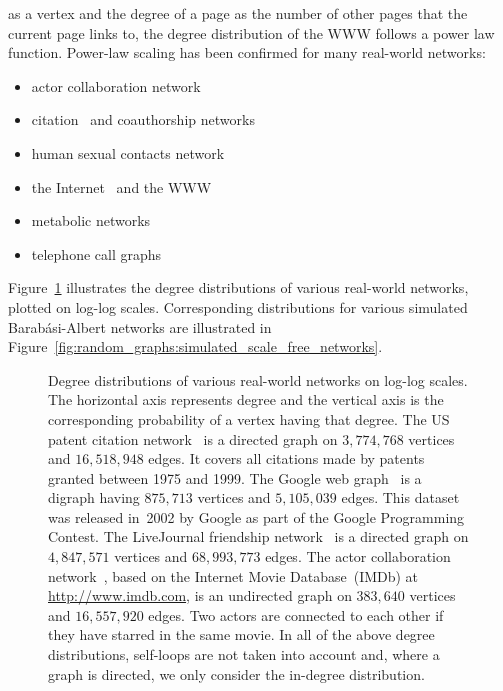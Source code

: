 as a vertex and the degree of a page as the number of other pages that
the current page links to, the degree distribution of the WWW follows
a power law function. Power-law scaling has been confirmed for many
real-world
networks:
\begin{itemize}
\item actor collaboration network~\cite{BarabasiAlbert1999}

\item citation~\cite{Price1965,Redner1998,Seglen1992} and
  coauthorship networks~\cite{Newman2001b}

\item human sexual contacts network~\cite{JonesHandcock2003,LiljerosEtAl2001}

\item the
  Internet~\cite{ChenEtAl2002,FaloutsosEtAl1999,VazquezEtAl2002} and
  the WWW~\cite{AlbertEtAl1999,BarabasiEtAl2000,BroderEtAl2000}

\item metabolic
  networks~\cite{JeongEtAl2001,JeongEtAl2000}

\item telephone call graphs~\cite{AielloEtAl2000,AielloEtAl2002}
\end{itemize}
Figure~\ref{fig:random_graphs:real_world_scale_free_networks}
illustrates the degree distributions of various real-world networks,
plotted on log-log scales. Corresponding distributions for various
simulated Barab\'asi-Albert networks are illustrated in
Figure~\ref{fig:random_graphs:simulated_scale_free_networks}.

\begin{figure}[!htbp]
\centering
{}

\caption{Degree distributions of various real-world networks on
  log-log scales. The horizontal axis represents degree and the
  vertical axis is the corresponding probability of a vertex having
  that degree. The US patent citation network~\cite{LeskovecEtAl2005}
  is a directed graph on $3,774,768$ vertices and $16,518,948$
  edges. It covers all citations made by patents granted between 1975
  and 1999. The Google web graph~\cite{LeskovecEtAl2008} is a digraph
  having $875,713$ vertices and $5,105,039$ edges. This dataset was
  released in~2002 by Google as part of the Google Programming
  Contest. The LiveJournal friendship
  network~\cite{BackstromEtAl2006,LeskovecEtAl2008} is a directed
  graph on $4,847,571$ vertices and $68,993,773$ edges. The actor
  collaboration network~\cite{BarabasiAlbert1999}, based on the
  Internet Movie Database~(IMDb) at \url{http://www.imdb.com}, is an
  undirected graph on $383,640$ vertices and $16,557,920$
  edges. Two actors are connected to each other if they have
  starred in the same movie. In all of the above degree distributions,
  self-loops are not taken into account and, where a graph is
  directed, we only consider the in-degree distribution.}
\label{fig:random_graphs:real_world_scale_free_networks}
\end{figure}

